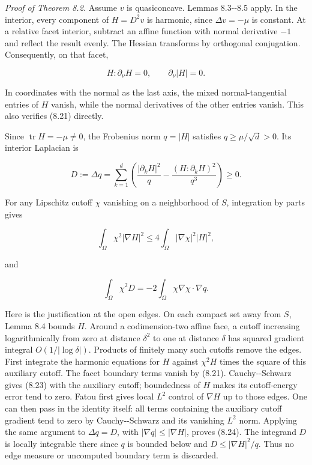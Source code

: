 \documentclass[11pt]{article}
\begin{document}
\emph{Proof of Theorem 8.2.} Assume \(v\) is quasiconcave. Lemmas
8.3-\/-8.5 apply. In the interior, every component of \(H=D^2v\) is
harmonic, since \(\Delta v=-\mu\) is constant. At a relative facet
interior, subtract an affine function with normal derivative \(-1\) and
reflect the result evenly. The Hessian transforms by orthogonal
conjugation. Consequently, on that facet,

\[
H:\partial_\nu H=0,
\qquad \partial_\nu |H|=0.
\tag{8.21}
\]

In coordinates with the normal as the last axis, the mixed
normal-tangential entries of \(H\) vanish, while the normal derivatives
of the other entries vanish. This also verifies (8.21) directly.

Since \(\operatorname{tr}H=-\mu\ne0\), the Frobenius norm \(q=|H|\)
satisfies \(q\ge\mu/\sqrt d>0\). Its interior Laplacian is

\[
D:=\Delta q=
\sum_{k=1}^d\left(
 \frac{|\partial_kH|^2}{q}
 -\frac{(H:\partial_kH)^2}{q^3}\right)\ge0.
\tag{8.22}
\]

For any Lipschitz cutoff \(\chi\) vanishing on a neighborhood of \(S\),
integration by parts gives

\[
\int_\Omega\chi^2|\nabla H|^2
 \le4\int_\Omega|\nabla\chi|^2|H|^2,
\tag{8.23}
\]

and

\[
\int_\Omega\chi^2D
 =-2\int_\Omega\chi\nabla\chi\cdot\nabla q.
\tag{8.24}
\]

Here is the justification at the open edges. On each compact set away
from \(S\), Lemma 8.4 bounds \(H\). Around a codimension-two affine
face, a cutoff increasing logarithmically from zero at distance
\(\delta^2\) to one at distance \(\delta\) has squared gradient integral
\(O(1/|\log\delta|)\). Products of finitely many such cutoffs remove the
edges. First integrate the harmonic equations for \(H\) against
\(\chi^2H\) times the square of this auxiliary cutoff. The facet
boundary terms vanish by (8.21). Cauchy-\/-Schwarz gives (8.23) with the
auxiliary cutoff; boundedness of \(H\) makes its cutoff-energy error
tend to zero. Fatou first gives local \(L^2\) control of \(\nabla H\) up
to those edges. One can then pass in the identity itself: all terms
containing the auxiliary cutoff gradient tend to zero by
Cauchy-\/-Schwarz and its vanishing \(L^2\) norm. Applying the same
argument to \(\Delta q=D\), with \(|\nabla q|\le|\nabla H|\), proves
(8.24). The integrand \(D\) is locally integrable there since \(q\) is
bounded below and \(D\le |\nabla H|^2/q\). Thus no edge measure or
uncomputed boundary term is discarded.
\end{document}
